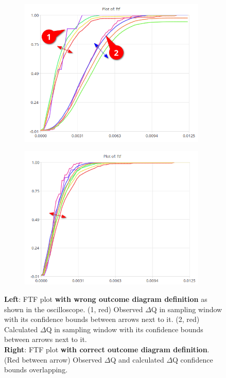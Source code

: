         \begin{figure}[H]
                \centering
                \begin{subfigure}{.5\textwidth}
                    \centering
                    \includegraphics[width =0.98\textwidth]{img/bad1.png}
                    \label{fig:bad}
                \end{subfigure}%
                \begin{subfigure}{.5\textwidth}%
                    \centering%
                    \includegraphics[width =0.98\textwidth]{img/gooda.png}%
                    \label{fig:good}%
                \end{subfigure}%
                \caption{\textbf{Left}: FTF plot \textbf{with wrong outcome diagram definition} as shown in the oscilloscope. (1, red) Observed $\Delta$Q in sampling window with its confidence bounds between arrows next to it. (2, red) Calculated $\Delta$Q in sampling window with its confidence bounds between arrows next to it. \\
                \textbf{Right}: FTF plot \textbf{with correct outcome diagram definition}. (Red between arrow) Observed $\Delta$Q and calculated $\Delta$Q confidence bounds overlapping.}
                \label{fig:ftf_osc}%
            \end{figure}%

